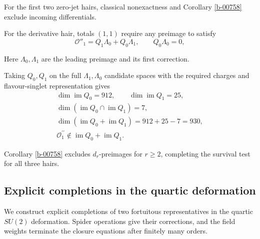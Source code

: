 \documentclass[11pt]{article}
\numberwithin{equation}{section}
\numberwithin{figure}{section}
\numberwithin{table}{section}
\begin{document}
\begin{proofbox}
For the first two zero-jet hairs, classical nonexactness \cite[Section 3.2]{KKLP} and Corollary \ref{b-00758} exclude incoming differentials.

For the derivative hair, totals $(1,1)$ require any preimage to satisfy
\begin{equation}\label{eq-hair-incoming}
\mathcal O''_1=Q_1\Lambda_0+Q_0\Lambda_1,
\qquad Q_0\Lambda_0=0,
\end{equation}

Here $\Lambda_0,\Lambda_1$ are the leading preimage and its first correction.

Taking $Q_0,Q_1$ on the full $\Lambda_1,\Lambda_0$ candidate spaces with the required charges and flavour-singlet representation gives \cite[Section 3.2]{KKLP}
\begin{equation*}
\begin{gathered}\dim\operatorname{im}Q_0=912,\qquad\dim\operatorname{im}Q_1=25,\\\dim(\operatorname{im}Q_0\cap\operatorname{im}Q_1)=7,\\\dim(\operatorname{im}Q_0+\operatorname{im}Q_1)=912+25-7=930,\\\mathcal O^{\prime\prime}_1\notin\operatorname{im}Q_0+\operatorname{im}Q_1.\end{gathered}
\end{equation*}

Corollary \ref{b-00758} excludes $d_r$-preimages for $r\ge2$, completing the survival test for all three hairs.
\end{proofbox}

\subsection{Explicit completions in the quartic deformation}\label{sec-quartic-fortuitous}

We construct explicit completions of two fortuitous representatives in the quartic $SU(2)$ deformation. Spider operations give their corrections, and the field weights terminate the closure equations after finitely many orders.
\end{document}
